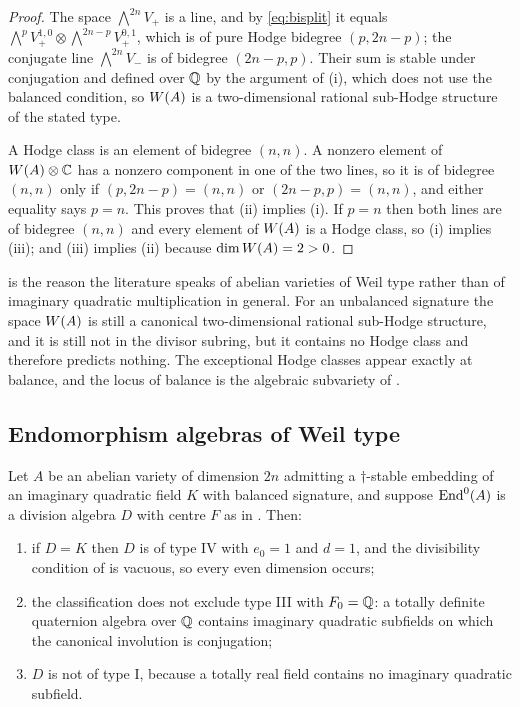 \begin{proof}
The space $\bigwedge^{2n}V_{+}$ is a line, and by \eqref{eq:bisplit} it equals
$\bigwedge^{p}V^{1,0}_{+}\otimes\bigwedge^{2n-p}V^{0,1}_{+}$, which is of pure
Hodge bidegree $(p,2n-p)$; the conjugate line $\bigwedge^{2n}V_{-}$ is of
bidegree $(2n-p,p)$. Their sum is stable under conjugation and defined over
$\mathbb{Q}$ by the argument of (i), which does not use the
balanced condition, so $W(A)$ is a two-dimensional rational sub-Hodge
structure of the stated type.

A Hodge class is an element of bidegree $(n,n)$. A nonzero element of
$W(A)\otimes\mathbb{C}$ has a nonzero component in one of the two lines, so it is of
bidegree $(n,n)$ only if $(p,2n-p)=(n,n)$ or $(2n-p,p)=(n,n)$, and either
equality says $p=n$. This proves that (ii) implies (i). If $p=n$ then both
lines are of bidegree $(n,n)$ and every element of $W(A)$ is a Hodge class,
so (i) implies (iii); and (iii) implies (ii) because $\dim W(A)=2>0$.
\end{proof}

\begin{remark}\label{rem:onlybalanced}
 is the reason the literature speaks of abelian
varieties of Weil type rather than of imaginary quadratic multiplication in
general. For an unbalanced signature the space $W(A)$ is still a canonical
two-dimensional rational sub-Hodge structure, and it is still not in the
divisor subring, but it contains no Hodge class and therefore predicts
nothing. The exceptional Hodge classes appear exactly at balance, and the
locus of balance is the algebraic subvariety of .
\end{remark}

\subsection{Endomorphism algebras of Weil type}

\begin{proposition}\label{prop:whichtypes}
Let $A$ be an abelian variety of dimension $2n$ admitting a $\dagger$-stable
embedding of an imaginary quadratic field $K$ with balanced signature, and
suppose $\operatorname{End}^{0}(A)$ is a division algebra $D$ with centre $F$ as in
. Then:
\begin{enumerate}[label=\textup{(\roman*)},nosep]
\item if $D=K$ then $D$ is of type IV with $e_{0}=1$ and $d=1$, and the
  divisibility condition of  is vacuous, so every even
  dimension occurs;
\item the classification does not exclude type III with $F_{0}=\mathbb{Q}$: a
  totally definite quaternion algebra over $\mathbb{Q}$ contains imaginary
  quadratic subfields on which the canonical involution is conjugation;
\item $D$ is not of type I, because a totally real field contains no
  imaginary quadratic subfield.
\end{enumerate}
\end{proposition}

